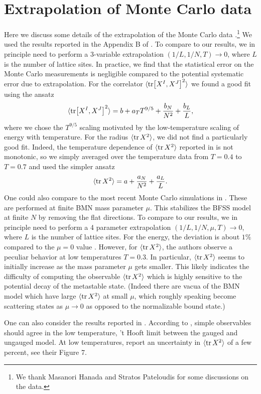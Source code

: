 \documentclass[11pt]{article}
\renewcommand{\ev}[1]{\langle #1 \rangle} %
\begin{document}
\section{Extrapolation of Monte Carlo data \label{extrapolate}}
Here we discuss some details of the extrapolation of the Monte Carlo data \cite{Berkowitz:2016jlq}.\footnote{We thank Masanori Hanada and Stratos Pateloudis for some discussions on the data.} We used the results reported in the Appendix B of \cite{Berkowitz:2016jlq}. To compare to our results, we in principle need to perform a 3-variable extrapolation $(1/L, 1/N, T) \to 0$, where $L$ is the number of lattice sites.  In practice, we find that the statistical error on the Monte Carlo measurements is negligible compared to the potential systematic error due to extrapolation. 
For the correlator $\ev{\tr[X^I,X^J]^2}$ we found a good fit using the ansatz
\begin{align}
\ev{\tr[X^I,X^J]^2} =  b +  a_T T^{9/5} +  \frac{b_N}{N^2}+  \frac{b_L}{L},
\end{align}
where we chose the $T^{9/5}$ scaling motivated by the low-temperature scaling of energy with temperature. For the radius $\ev{\tr X^2}$, we did not find a particularly good fit. Indeed, the temperature dependence of $\ev{\tr X^2}$ reported in \cite{Berkowitz:2016jlq} is not monotonic, so we simply averaged over the temperature data from $T = 0.4$ to $T=0.7$ and used the simpler ansatz
\begin{align}
\ev{\tr X^2} =  a +  \frac{a_N}{N^2}+  \frac{a_L}{L}.
\end{align}
One could also compare to the most recent Monte Carlo simulations in \cite{Pateloudis:2022ijr}. These are performed at finite BMN \cite{Berenstein:2002jq} mass parameter  $\mu$. This stabilizes the BFSS model at finite $N$ by removing the flat directions. To compare to our results, we in principle need to perform a 4 parameter extrapolation $(1/L, 1/N, \mu, T) \to 0$, where $L$ is the number of lattice sites. For the energy, the deviation is about $1\%$ compared to the $\mu = 0$ value \cite{Pateloudis:2022ijr}. However, for $\ev{\tr X^2}$, the authors \cite{Pateloudis:2022ijr} observe a peculiar behavior at low temperatures $T=0.3$. In particular,  $\ev{\tr X^2}$ seems to initially increase as the mass parameter $\mu$ gets smaller. This likely indicates the difficulty of computing the observable $\ev{\tr X^2}$ which is highly sensitive to the potential decay of the metastable state. (Indeed there are vacua of the BMN model which have large $\ev{\tr X^2}$ at small $\mu$, which roughly speaking become scattering states as $\mu \to 0$ as opposed to the normalizable bound state.)

One can also consider the results reported in \cite{Berkowitz:2018qhn}. According to \cite{Maldacena:2018vsr, Berkowitz:2018qhn}, simple observables should agree in the low temperature, 't Hooft limit between the gauged and ungauged model. At low temperatures, \cite{Berkowitz:2018qhn} report an uncertainty in $\ev{\tr X^2}$ of a few percent, see their Figure 7.




\end{document}
